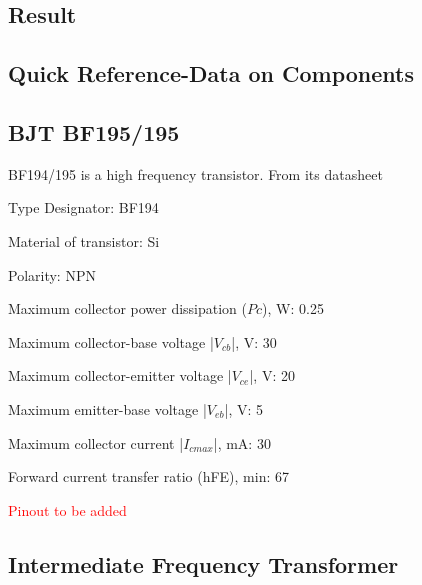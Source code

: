 \documentclass{book}
\begin{document}
\section*{Result}
\begin{appendix}
\chapter {Quick Reference-Data on Components}
\section{BJT BF195/195}
\label{BF194/195}
 BF194/195 is a high frequency transistor. From its datasheet 

Type Designator: BF194

Material of transistor: Si

Polarity: NPN

Maximum collector power dissipation ($Pc$), W: 0.25

Maximum collector-base voltage |$V_{cb}$|, V: 30

Maximum collector-emitter voltage |$V_{ce}$|, V: 20

Maximum emitter-base voltage |$V_{eb}$|, V: 5

Maximum collector current |$I_{c max}$|, mA: 30

Forward current transfer ratio (hFE), min: 67

\textcolor{red}{Pinout to be added}

\section{Intermediate Frequency Transformer}
\label{IFT}



\end{appendix}
\begin{thebibliography}{1}

\end{thebibliography}
\end{document}
